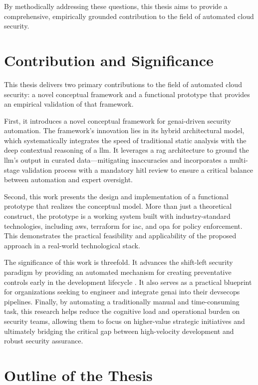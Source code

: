 By methodically addressing these questions, this thesis aims to provide a comprehensive, empirically grounded contribution to the field of automated cloud security.

\section{Contribution and Significance}
\label{sec:contribution}

This thesis delivers two primary contributions to the field of automated cloud security: a novel conceptual framework and a functional prototype that provides an empirical validation of that framework.

First, it introduces a novel conceptual framework for \gls{genai}-driven security automation. The framework's innovation lies in its hybrid architectural model, which systematically integrates the speed of traditional static analysis with the deep contextual reasoning of a \gls{llm}. It leverages a \gls{rag} architecture to ground the \gls{llm}'s output in curated data—mitigating inaccuracies and incorporates a multi-stage validation process with a mandatory \gls{hitl} review to ensure a critical balance between automation and expert oversight.

Second, this work presents the design and implementation of a functional prototype that realizes the conceptual model. More than just a theoretical construct, the prototype is a working system built with industry-standard technologies, including \gls{aws}, \gls{terraform} for \gls{iac}, and \gls{opa} for policy enforcement. This demonstrates the practical feasibility and applicability of the proposed approach in a real-world technological stack.

The significance of this work is threefold. It advances the shift-left security paradigm by providing an automated mechanism for creating preventative controls early in the development lifecycle \cite{akto_shift_2025}. It also serves as a practical blueprint for organizations seeking to engineer and integrate \gls{genai} into their \gls{devsecops} pipelines. Finally, by automating a traditionally manual and time-consuming task, this research helps reduce the cognitive load and operational burden on security teams, allowing them to focus on higher-value strategic initiatives and ultimately bridging the critical gap between high-velocity development and robust security assurance.

\section{Outline of the Thesis}
\label{sec:outline}

